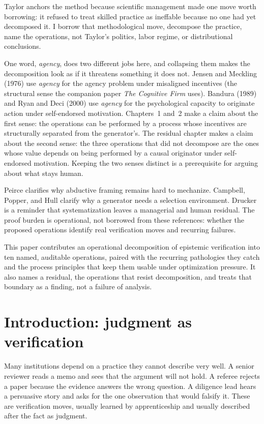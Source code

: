 \documentclass[
  11pt,
]{article}
\begin{document}
Taylor anchors the method because scientific management made one move
worth borrowing: it refused to treat skilled practice as ineffable
because no one had yet decomposed it. I borrow that methodological move, decompose the practice, name the operations, not Taylor's politics,
labor regime, or distributional conclusions.

One word, \emph{agency}, does two different jobs here, and collapsing
them makes the decomposition look as if it threatens something it does
not. Jensen and Meckling (1976) use \emph{agency} for the agency problem
under misaligned incentives (the structural sense the companion paper
\emph{The Cognitive Firm} uses). Bandura (1989) and Ryan and Deci (2000)
use \emph{agency} for the psychological capacity to originate action
under self-endorsed motivation. Chapters~1 and~2 make a claim about the
first sense: the operations can be performed by a process whose
incentives are structurally separated from the generator's. The residual
chapter makes a claim about the second sense: the three operations that
did not decompose are the ones whose value depends on being performed by
a causal originator under self-endorsed motivation. Keeping the two
senses distinct is a prerequisite for arguing about what stays
human.

Peirce clarifies why abductive framing remains hard to mechanize.
Campbell, Popper, and Hull clarify why a generator needs a selection
environment. Drucker is a reminder that systematization leaves a
managerial and human residual. The proof burden is operational, not
borrowed from these references: whether the proposed operations identify
real verification moves and recurring failures.

This paper contributes an operational decomposition of epistemic
verification into ten named, auditable operations, paired with the
recurring pathologies they catch and the process principles that keep them
usable under optimization pressure. It also names a residual, the
operations that resist decomposition, and treats that boundary as a
finding, not a failure of analysis.

\section{Introduction: judgment as
verification}\label{introduction-judgment-as-verification}

Many institutions depend on a practice they cannot describe very well. A
senior reviewer reads a memo and sees that the argument will not hold. A
referee rejects a paper because the evidence answers the wrong question.
A diligence lead hears a persuasive story and asks for the one
observation that would falsify it. These are verification moves, usually
learned by apprenticeship and usually described after the fact as
judgment.
\end{document}
